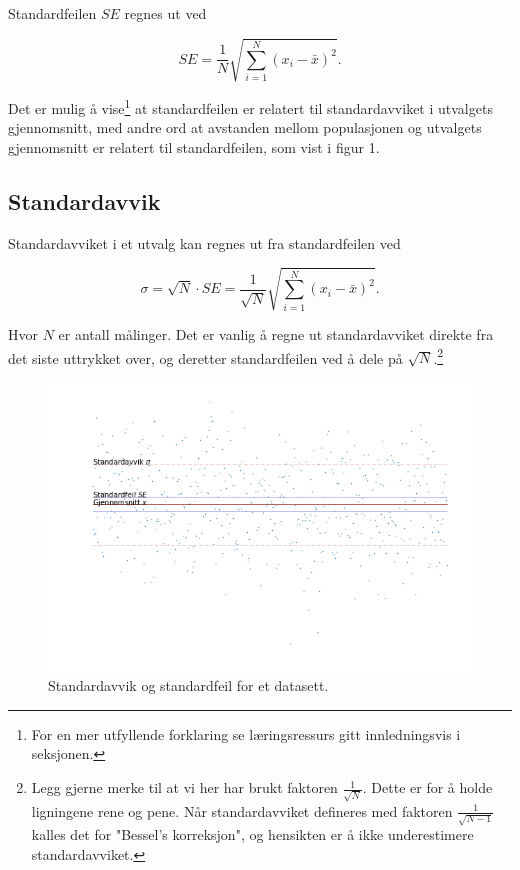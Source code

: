 \documentclass[a4paper,9pt]{article}
\begin{document}
Standardfeilen $SE$ regnes ut ved

\begin{equation}
\label{eqn:standarderror}
SE = \frac{1}{N} \sqrt{\sum_{i=1}^N (x_i - \bar{x})^2}.
\end{equation}

Det er mulig å vise\footnote{For en mer utfyllende forklaring se læringsressurs gitt innledningsvis i seksjonen.} at standardfeilen er relatert til standardavviket i utvalgets gjennomsnitt, med andre ord at avstanden mellom populasjonen og utvalgets gjennomsnitt er relatert til standardfeilen, som vist i figur 1. 

\FloatBarrier

\subsection{Standardavvik}

Standardavviket i et utvalg kan regnes ut fra standardfeilen ved

\begin{equation}
\label{eqn:standarddev}
\sigma = \sqrt{N} \cdot SE =\frac{1}{\sqrt{N}} \sqrt{ \sum_{i=1}^N (x_i - \bar{x})^2} .
\end{equation}

Hvor $N$ er antall målinger. Det er vanlig å regne ut standardavviket direkte fra det siste uttrykket over, og deretter standardfeilen ved å dele på $\sqrt{N}$.\footnote{Legg gjerne merke til at vi her har brukt faktoren $\frac{1}{\sqrt{N}}$. Dette er for å holde ligningene rene og pene. Når standardavviket defineres med faktoren $\frac{1}{\sqrt{N-1}}$  kalles det for "Bessel's korreksjon", og hensikten er å ikke underestimere standardavviket.}

\begin{figure}[h]
\centering
\includegraphics[width=\textwidth]{standardfeil1}
\caption{Standardavvik og standardfeil for et datasett.}
\end{figure}
 
\end{document}
